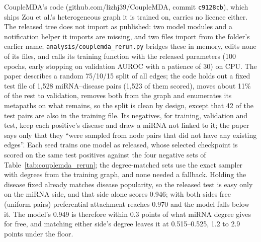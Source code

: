\documentclass[review]{elsarticle}
\begin{document}
CoupleMDA's code (github.com/lizhj39/CoupleMDA, commit \texttt{c9128cb}), which ships Zou et al.'s heterogeneous
graph it is trained on, carries no licence either. The released tree does not import as published: two model
modules and a notification helper it imports are missing, and two files import from the folder's earlier name;
\texttt{analysis/couplemda\_rerun.py} bridges these in memory, edits none of its files, and calls its training
function with the released parameters (100 epochs, early stopping on validation AUROC with a patience of 30) on
CPU. The paper describes a random 75/10/15 split of all edges; the code holds out a fixed test file of 1,528
miRNA--disease pairs (1,523 of them scored), moves about 11\% of the rest to validation, removes both
from the graph and enumerates its metapaths on what remains, so the split is clean by design, except that 42
of the test pairs are also in the training file. Its negatives, for training, validation and test, keep each
positive's disease and draw a miRNA not linked to it; the paper says only that they ``were sampled from node pairs
that did not have any existing edges''. Each seed trains one model as released, whose selected checkpoint is
scored on the same test positives against the four negative sets of Table~\ref{tab:couplemda_rerun}; the
degree-matched sets use the exact sampler with degrees from the training graph, and none needed a fallback.
Holding the disease fixed already matches disease popularity, so the released test is easy only on the miRNA
side, and that side alone scores 0.946; with both sides free (uniform pairs) preferential attachment reaches
0.970 and the model falls below it. The model's 0.949 is therefore within 0.3 points of what miRNA degree gives
for free, and matching either side's degree leaves it at 0.515--0.525, 1.2 to 2.9 points under the floor.


\end{document}
